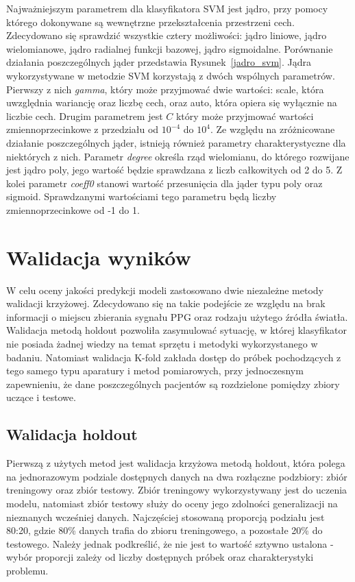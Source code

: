 \documentclass[a4paper,twoside,12pt]{book}
\begin{document}
Najważniejszym parametrem dla klasyfikatora SVM jest jądro, przy pomocy którego dokonywane są wewnętrzne przekształcenia przestrzeni cech. Zdecydowano się sprawdzić wszystkie cztery możliwości: jądro liniowe, jądro wielomianowe, jądro radialnej funkcji bazowej, jądro sigmoidalne. Porównanie działania poszczególnych jąder przedstawia Rysunek~\ref{jadro_svm}.
Jądra wykorzystywane w metodzie SVM korzystają z dwóch wspólnych parametrów. Pierwszy z nich \textit{gamma}, który może przyjmować dwie wartości: scale, która uwzględnia wariancję oraz liczbę cech, oraz auto, która opiera się wyłącznie na liczbie cech. Drugim parametrem jest $C$ który może przyjmować wartości zmiennoprzecinkowe z przedziału od $10^{-4}$ do $10^{4}$.
Ze względu na zróżnicowane działanie poszczególnych jąder, istnieją również parametry charakterystyczne dla niektórych z nich. Parametr \textit{degree}  określa rząd wielomianu, do którego rozwijane jest jądro poly, jego wartość będzie sprawdzana z liczb całkowitych od 2 do 5. Z kolei parametr \textit{coeff0} stanowi wartość przesunięcia dla jąder typu poly oraz sigmoid. Sprawdzanymi wartościami tego parametru będą liczby zmiennoprzecinkowe od -1 do 1.


\section{Walidacja wyników}
W celu oceny jakości predykcji modeli zastosowano dwie niezależne metody walidacji krzyżowej. Zdecydowano się na takie podejście ze względu na brak informacji o miejscu zbierania sygnału PPG oraz rodzaju użytego źródła światła. Walidacja metodą holdout pozwoliła zasymulować sytuację, w której klasyfikator nie posiada żadnej wiedzy na temat sprzętu i metodyki wykorzystanego w badaniu. Natomiast walidacja K-fold zakłada dostęp do próbek pochodzących z tego samego typu aparatury i metod pomiarowych, przy jednoczesnym zapewnieniu, że dane poszczególnych pacjentów są rozdzielone pomiędzy zbiory uczące i testowe.\\



\subsection*{Walidacja holdout}
Pierwszą z użytych metod jest walidacja krzyżowa metodą holdout, która polega na jednorazowym podziale dostępnych danych na dwa rozłączne podzbiory: zbiór treningowy oraz zbiór testowy. Zbiór treningowy wykorzystywany jest do uczenia modelu, natomiast zbiór testowy służy do oceny jego zdolności generalizacji na nieznanych wcześniej danych. Najczęściej stosowaną proporcją podziału jest 80:20, gdzie 80\% danych trafia do zbioru treningowego, a pozostałe 20\% do testowego. Należy jednak podkreślić, że nie jest to wartość sztywno ustalona - wybór proporcji zależy od liczby dostępnych próbek oraz charakterystyki problemu.
\end{document}
